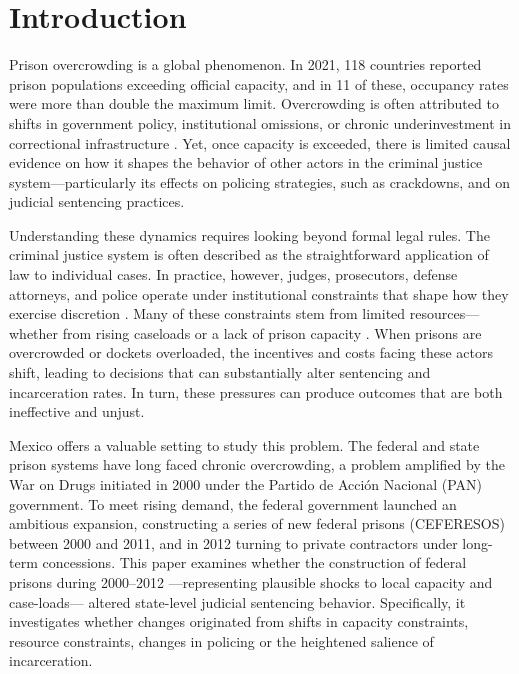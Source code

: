 \section{Introduction}

Prison overcrowding is a global phenomenon. In 2021, 118 countries reported prison populations exceeding official capacity, and in 11 of these, occupancy rates were more than double the maximum limit. Overcrowding is often attributed to shifts in government policy, institutional omissions, or chronic underinvestment in correctional infrastructure \citep{GlobalPrisonTrends}. Yet, once capacity is exceeded, there is limited causal evidence on how it shapes the behavior of other actors in the criminal justice system—particularly its effects on policing strategies, such as crackdowns, and on judicial sentencing practices.

Understanding these dynamics requires looking beyond formal legal rules. The criminal justice system is often described as the straightforward application of law to individual cases. In practice, however, judges, prosecutors, defense attorneys, and police operate under institutional constraints that shape how they exercise discretion \citep{Ouss-Incentives, Ater-Police-Org-JPE}. Many of these constraints stem from limited resources—whether from rising caseloads or a lack of prison capacity \citep{Schnepel, Yang-Resource-AEJ}. When prisons are overcrowded or dockets overloaded, the incentives and costs facing these actors shift, leading to decisions that can substantially alter sentencing and incarceration rates. In turn, these pressures can produce outcomes that are both ineffective and unjust.

Mexico offers a valuable setting to study this problem. The federal and state prison systems have long faced chronic overcrowding, a problem amplified by the War on Drugs initiated in 2000 under the Partido de Acción Nacional (PAN) government. To meet rising demand, the federal government launched an ambitious expansion, constructing a series of new federal prisons (CEFERESOS) between 2000 and 2011, and in 2012 turning to private contractors under long-term concessions. This paper examines whether the construction of federal prisons during 2000–2012 —representing plausible shocks to local capacity and case-loads— altered state-level judicial sentencing behavior. Specifically, it investigates whether changes originated from shifts in capacity constraints, resource constraints, changes in policing or the heightened salience of incarceration.

